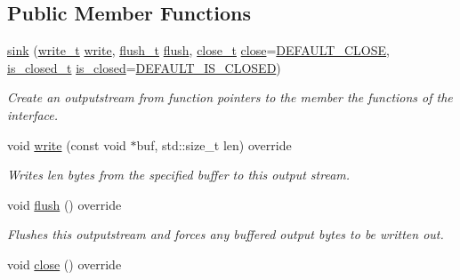 \subsection*{Public Member Functions}
\begin{DoxyCompactItemize}
\item 
\hyperlink{structdevfix_1_1base_1_1io_1_1sink_a5e065482904521fde4ac8d0e378529c8}{sink} (\hyperlink{namespacedevfix_1_1base_1_1io_aaa3124cddb420001b0296561c60f8fcd}{write\+\_\+t} \hyperlink{structdevfix_1_1base_1_1io_1_1sink_ae0edc765741de5514b24ccc17457ec96}{write}, \hyperlink{namespacedevfix_1_1base_1_1io_a622685976c7f503411827fba028d3ce1}{flush\+\_\+t} \hyperlink{structdevfix_1_1base_1_1io_1_1sink_ae19459626df6d3c9ad313e2171a67c3f}{flush}, \hyperlink{namespacedevfix_1_1base_1_1io_ae3118387742e5f4d484a328a213d6a5d}{close\+\_\+t} \hyperlink{structdevfix_1_1base_1_1io_1_1sink_a2b13891b8bb50f6d1a01c52d58154bc5}{close}=\hyperlink{namespacedevfix_1_1base_1_1io_a14a286c17d4b93881d42b1d14beb2d0b}{D\+E\+F\+A\+U\+L\+T\+\_\+\+C\+L\+O\+SE}, \hyperlink{namespacedevfix_1_1base_1_1io_a14f89d4437ced6ede49c044ee8e71f17}{is\+\_\+closed\+\_\+t} \hyperlink{structdevfix_1_1base_1_1io_1_1sink_a7d006bfd462ad29884aef9f6a7f40006}{is\+\_\+closed}=\hyperlink{namespacedevfix_1_1base_1_1io_ae04fec2a2a2db3482e624a59e59a2a14}{D\+E\+F\+A\+U\+L\+T\+\_\+\+I\+S\+\_\+\+C\+L\+O\+S\+ED})
\begin{DoxyCompactList}\small\item\em Create an {\itshape outputstream} from function pointers to the member the functions of the interface. \end{DoxyCompactList}\item 
void \hyperlink{structdevfix_1_1base_1_1io_1_1sink_ae0edc765741de5514b24ccc17457ec96}{write} (const void $\ast$buf, std\+::size\+\_\+t len) override
\begin{DoxyCompactList}\small\item\em Writes len bytes from the specified buffer to this output stream. \end{DoxyCompactList}\item 
void \hyperlink{structdevfix_1_1base_1_1io_1_1sink_ae19459626df6d3c9ad313e2171a67c3f}{flush} () override
\begin{DoxyCompactList}\small\item\em Flushes this {\itshape outputstream} and forces any buffered output bytes to be written out. \end{DoxyCompactList}\item 
void \hyperlink{structdevfix_1_1base_1_1io_1_1sink_a2b13891b8bb50f6d1a01c52d58154bc5}{close} () override

\end{DoxyCompactItemize}
